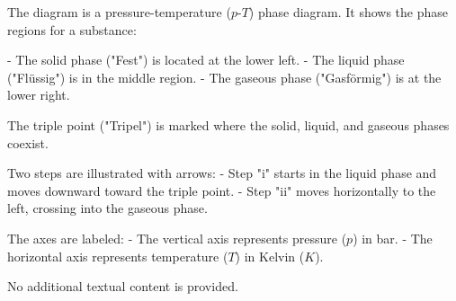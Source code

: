 The diagram is a pressure-temperature (\( p \)-\( T \)) phase diagram. It shows the phase regions for a substance:  

- The solid phase ("Fest") is located at the lower left.  
- The liquid phase ("Flüssig") is in the middle region.  
- The gaseous phase ("Gasförmig") is at the lower right.  

The triple point ("Tripel") is marked where the solid, liquid, and gaseous phases coexist.  

Two steps are illustrated with arrows:  
- Step "i" starts in the liquid phase and moves downward toward the triple point.  
- Step "ii" moves horizontally to the left, crossing into the gaseous phase.  

The axes are labeled:  
- The vertical axis represents pressure (\( p \)) in bar.  
- The horizontal axis represents temperature (\( T \)) in Kelvin (\( K \)).  

No additional textual content is provided.